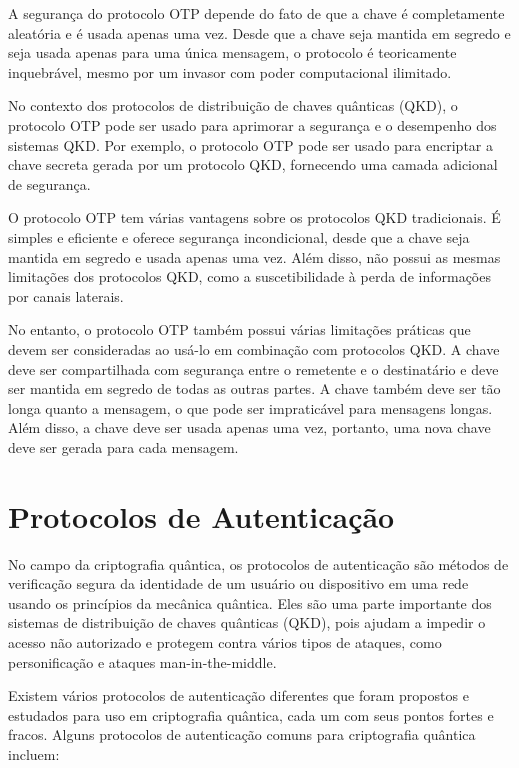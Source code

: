 A segurança do protocolo OTP depende do fato de que a chave é completamente aleatória e é usada apenas uma vez. Desde que a chave seja mantida em segredo e seja usada apenas para uma única mensagem, o protocolo é teoricamente inquebrável, mesmo por um invasor com poder computacional ilimitado.

No contexto dos protocolos de distribuição de chaves quânticas (QKD), o protocolo OTP pode ser usado para aprimorar a segurança e o desempenho dos sistemas QKD. Por exemplo, o protocolo OTP pode ser usado para encriptar a chave secreta gerada por um protocolo QKD, fornecendo uma camada adicional de segurança.

O protocolo OTP tem várias vantagens sobre os protocolos QKD tradicionais. É simples e eficiente e oferece segurança incondicional, desde que a chave seja mantida em segredo e usada apenas uma vez. Além disso, não possui as mesmas limitações dos protocolos QKD, como a suscetibilidade à perda de informações por canais laterais.

No entanto, o protocolo OTP também possui várias limitações práticas que devem ser consideradas ao usá-lo em combinação com protocolos QKD. A chave deve ser compartilhada com segurança entre o remetente e o destinatário e deve ser mantida em segredo de todas as outras partes. A chave também deve ser tão longa quanto a mensagem, o que pode ser impraticável para mensagens longas. Além disso, a chave deve ser usada apenas uma vez, portanto, uma nova chave deve ser gerada para cada mensagem.

\section{Protocolos de Autenticação}

No campo da criptografia quântica, os protocolos de autenticação são métodos de verificação segura da identidade de um usuário ou dispositivo em uma rede usando os princípios da mecânica quântica. Eles são uma parte importante dos sistemas de distribuição de chaves quânticas (QKD), pois ajudam a impedir o acesso não autorizado e protegem contra vários tipos de ataques, como personificação e ataques man-in-the-middle.

Existem vários protocolos de autenticação diferentes que foram propostos e estudados para uso em criptografia quântica, cada um com seus pontos fortes e fracos. Alguns protocolos de autenticação comuns para criptografia quântica incluem:

